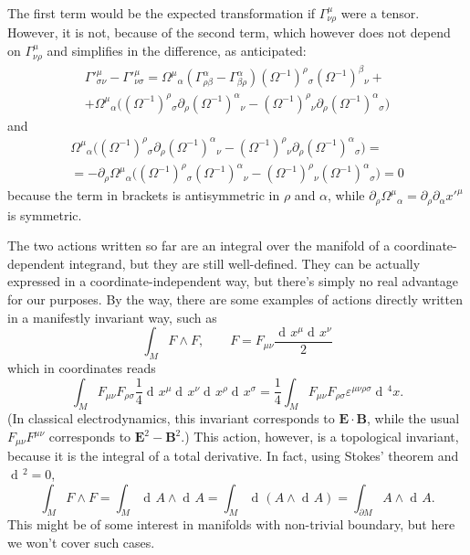 \documentclass[a4paper,12pt]{book}
\renewcommand{\vec}{\mathbf}
\newcommand{\dd}{\mathop{\mathrm{d}\!}{}}
\theoremstyle{definition}
\theoremstyle{remark}
\begin{document}
The first term would be the expected transformation if $\Gamma^\mu_{\nu\rho}$ were a tensor. However, it is not, because of the second term, which however does not depend on $\Gamma^\mu_{\nu\rho}$ and simplifies in the difference, as anticipated:
\begin{multline*}\Gamma'^\mu_{\sigma\nu}-\Gamma'^\mu_{\nu\sigma}=\Omega^\mu{}_\alpha(\Gamma^\alpha_{\rho\beta}-\Gamma^\alpha_{\beta\rho})(\Omega^{-1})^\rho{}_\sigma(\Omega^{-1})^\beta{}_\nu+\\
+\Omega^\mu{}_\alpha\bigl((\Omega^{-1})^\rho{}_\sigma\partial_\rho(\Omega^{-1})^\alpha{}_\nu-(\Omega^{-1})^\rho{}_\nu\partial_\rho(\Omega^{-1})^\alpha{}_\sigma\bigr)
\end{multline*}
and
\begin{multline*}
\Omega^\mu{}_\alpha\bigl((\Omega^{-1})^\rho{}_\sigma\partial_\rho(\Omega^{-1})^\alpha{}_\nu-(\Omega^{-1})^\rho{}_\nu\partial_\rho(\Omega^{-1})^\alpha{}_\sigma\bigr)=\\
=-\partial_\rho\Omega^\mu{}_\alpha\bigl((\Omega^{-1})^\rho{}_\sigma(\Omega^{-1})^\alpha{}_\nu-(\Omega^{-1})^\rho{}_\nu(\Omega^{-1})^\alpha{}_\sigma\bigr)=0
\end{multline*}
because the term in brackets is antisymmetric in $\rho$ and $\alpha$, while $\partial_\rho\Omega^\mu{}_\alpha=\partial_\rho\partial_\alpha x'^\mu$ is symmetric.

The two actions written so far are an integral over the manifold of a coordinate-dependent integrand, but they are still well-defined. They can be actually expressed in a coordinate-independent way, but there's simply no real advantage for our purposes. By the way, there are some examples of actions directly written in a manifestly invariant way, such as
\[\int_MF\wedge F,\qquad F=F_{\mu\nu}\frac{\dd x^\mu\dd x^\nu}{2}\]
which in coordinates reads
\[\int_MF_{\mu\nu}F_{\rho\sigma}\frac{1}{4}\dd x^\mu\dd x^\nu\dd x^\rho\dd x^\sigma=\frac{1}{4}\int_MF_{\mu\nu}F_{\rho\sigma}\varepsilon^{\mu\nu\rho\sigma}\dd^4x.\]
(In classical electrodynamics, this invariant corresponds to $\vec E\cdot \vec B$, while the usual $F_{\mu\nu}F^{\mu\nu}$ corresponds to $\vec E^2-\vec B^2$.) This action, however, is a topological invariant, because it is the integral of a total derivative. In fact, using Stokes' theorem and $\dd^2=0$,
\[\int_MF\wedge F=\int_M\dd A\wedge\dd A=\int_M\dd(A\wedge\dd A)=\int_{\partial M}A\wedge\dd A.\]
This might be of some interest in manifolds with non-trivial boundary, but here we won't cover such cases.
\end{document}
